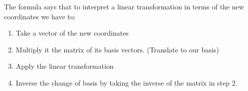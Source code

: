 The formula says that to interpret a linear transformation in terms of the
new coordinates we have to:

\begin{enumerate}
    
    \item Take a vector of the new coordinates
    
    \item Multiply it the matrix of its basis vectors. (Translate to our basis)
    
    \item Apply the linear transformation
    
    \item Inverse the change of basis by taking the inverse of the 
          matrix in step 2.

\end{enumerate}
